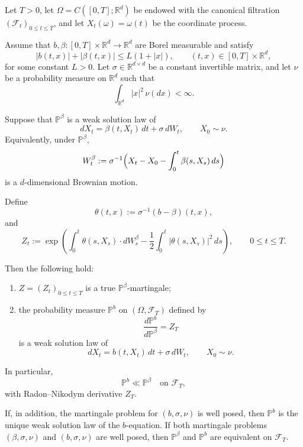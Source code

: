 \documentclass[twoside,11pt]{article}
\numberwithin{equation}{section}
\begin{document}
\begin{lemma}\label{thm:girsanov-linear-growth}
Let $T>0$, let $\Omega=C([0,T];\mathbb R^d)$ be endowed with the canonical filtration
$(\mathcal F_t)_{0\le t\le T}$, and let $X_t(\omega)=\omega(t)$ be the coordinate process.

Assume that $b,\beta:[0,T]\times \mathbb R^d\to\mathbb R^d$ are Borel measurable and satisfy
\[
|b(t,x)|+|\beta(t,x)|\le L(1+|x|), \qquad (t,x)\in[0,T]\times\mathbb R^d,
\]
for some constant $L>0$. Let $\sigma\in\mathbb R^{d\times d}$ be a constant invertible matrix, and let $\nu$ be a probability measure on $\mathbb R^d$ such that
\[
\int_{\mathbb R^d}|x|^2\,\nu(dx)<\infty.
\]

Suppose that $\mathbb{P}^\beta$ is a weak solution law of
\[
dX_t=\beta(t,X_t)\,dt+\sigma\,dW_t,\qquad X_0\sim \nu.
\]
Equivalently, under $\mathbb{P}^\beta$,
\[
W_t^\beta:=\sigma^{-1}\Bigl(X_t-X_0-\int_0^t \beta(s,X_s)\,ds\Bigr)
\]
is a $d$-dimensional Brownian motion.

Define
\[
\theta(t,x):=\sigma^{-1}(b-\beta)(t,x),
\]
and
\[
Z_t
:=
\exp\!\left(
\int_0^t \theta(s,X_s)\cdot dW_s^\beta
-\frac12\int_0^t |\theta(s,X_s)|^2\,ds
\right),\qquad 0\le t\le T.
\]

Then the following hold:
\begin{enumerate}
\item $Z=(Z_t)_{0\le t\le T}$ is a true $\mathbb{P}^\beta$-martingale;
\item the probability measure $\mathbb{P}^b$ on $(\Omega,\mathcal F_T)$ defined by
\[
\frac{d\mathbb{P}^b}{d\mathbb{P}^\beta}=Z_T
\]
is a weak solution law of
\[
dX_t=b(t,X_t)\,dt+\sigma\,dW_t,\qquad X_0\sim \nu.
\]
\end{enumerate}
In particular,
\[
\mathbb{P}^b\ll \mathbb{P}^\beta \quad\text{on }\mathcal F_T,
\]
with Radon--Nikodym derivative $Z_T$.

If, in addition, the martingale problem for $(b,\sigma,\nu)$ is well posed, then $\mathbb{P}^b$ is the unique weak solution law of the $b$-equation. If both martingale problems $(\beta,\sigma,\nu)$ and $(b,\sigma,\nu)$ are well posed, then $\mathbb{P}^\beta$ and $\mathbb{P}^b$ are equivalent on $\mathcal F_T$.
\end{lemma}
\end{document}

